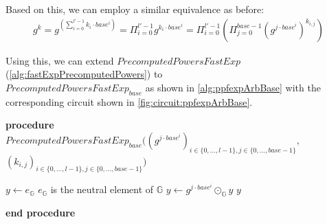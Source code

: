 Based on this, we can employ a similar equivalence as before:
\begin{align*}
    g^k=g^{\left(\sum_{i=0}^{l'-1}k_i\cdot base^i\right)}=\Pi_{i=0}^{l'-1}g^{k_i\cdot base^i}=\Pi_{i=0}^{l'-1} \left(\Pi_{j=0}^{base-1} \left(g^{j\cdot base^i}\right)^{k_{i,j}}\right)
\end{align*}

Using this, we can extend $PrecomputedPowersFastExp$ (\cref{alg:fastExpPrecomputedPowers}) to \\$PrecomputedPowersFastExp_{base}$ as shown in \cref{alg:ppfexpArbBase} with the corresponding circuit shown in \cref{fig:circuit:ppfexpArbBase}.

\begin{Algorithmus}[h] %
    \caption{Algorithm $PrecomputedPowersFastExp_{base}$ used to compute $g^k$ for $g\in\mathbb{G}$ and $k\in\{0,\dots, |\mathbb{G}|-1\}$.
    Here, $k$ is provided as a representation to base $base$ of length $l$: $\left(k_{i,j}\right)_{i\in\{0,\dots, l-1\},j\in\{0,\dots, base-1\}}\in\{0,1\}^{l\times base}$ with $k=\sum_{i=0}^{l-1}\sum_{j=0}^{base-1} k_{i,j}\cdot j\cdot base^{i}$ and $\forall i\in\{0,\dots, l-1\}\exists! j:k_{i,j}=1$.
    Furthermore, $\left(g^{j\cdot base^i}\right)_{i\in\{0,\dots, l-1\}, j\in\{0,\dots, base-1\}}$ are precomputed powers of $g$.}
    \label{alg:ppfexpArbBase}
    \begin{algorithmic}
    \State \textbf{procedure} $PrecomputedPowersFastExp_{base} \Bigg(\left(g^{j\cdot base^i}\right)_{i\in\{0,\dots, l-1\}, j\in\{0,\dots, base-1\}}, $
        \Statex \hspace{9cm}%
        $\left(k_{i,j}\right)_{i\in\{0,\dots, l-1\},j\in\{0,\dots, base-1\}}\Bigg)$
        \begin{algorithmic}            
        \State $y\gets e_\mathbb{G}$ \Comment $e_\mathbb{G}$ is the neutral element of $\mathbb{G}$
                    \State $y\gets g^{j\cdot base^i}\odot_\mathbb{G} y$
                \EndIf
            \EndFor
        \EndFor
        \State \Return $y$
        \end{algorithmic}    
    \State \hspace*{-\algorithmicindent}\textbf{end procedure}
    \end{algorithmic}
\end{Algorithmus}

